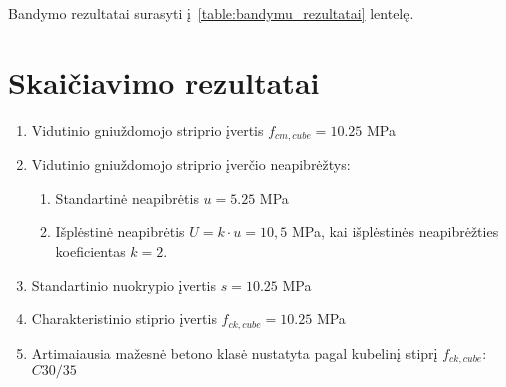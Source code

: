 \documentclass[a4paper, 12pt]{article}
\begin{document}
Bandymo rezultatai surasyti į~\ref{table:bandymu_rezultatai} lentelę.

\section{Skaičiavimo rezultatai}
\begin{enumerate}
	\item \hspace{\parindent}Vidutinio gniuždomojo striprio įvertis $ f_{cm,cube} =  10.25 $ MPa %
	      
	\item Vidutinio gniuždomojo striprio įverčio neapibrėžtys:
	      \begin{enumerate}
		      \item Standartinė neapibrėtis  $ u =  5.25 $ MPa %
		            
		      \item Išplėstinė neapibrėtis  $ U = k \cdot u = 10,5 $ MPa, kai išplėstinės neapibrėžties koeficientas $ k = 2$. %
		            
	      \end{enumerate}
	      
	\item Standartinio nuokrypio įvertis $ s = 10.25 $ MPa %
	      
	\item  Charakteristinio stiprio įvertis $ f_{ck,cube} = 10.25 $ MPa %
	      
	\item Artimaiausia mažesnė betono klasė nustatyta pagal kubelinį stiprį $f_{ck,cube}$: $ C30/35 $
\end{enumerate}
\end{document}
